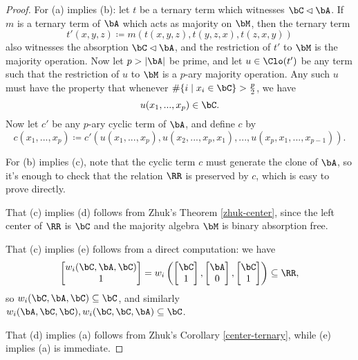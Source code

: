 \begin{proof} For (a) implies (b): let $t$ be a ternary term which witnesses $\bC \lhd \bA$. If $m$ is a ternary term of $\bA$ which acts as majority on $\bM$, then the ternary term
\[
t'(x,y,z) \coloneqq m(t(x,y,z), t(y,z,x), t(z,x,y))
\]
also witnesses the absorption $\bC \lhd \bA$, and the restriction of $t'$ to $\bM$ is the majority operation. Now let $p > |\bA|$ be prime, and let $u \in \Clo(t')$ be any term such that the restriction of $u$ to $\bM$ is a $p$-ary majority operation. Any such $u$ must have the property that whenever $\#\{i \mid x_i \in \bC\} > \frac{p}{2}$, we have
\[
u(x_1, ..., x_p) \in \bC.
\]
Now let $c'$ be any $p$-ary cyclic term of $\bA$, and define $c$ by
\[
c(x_1, ..., x_p) \coloneqq c'(u(x_1, ..., x_p), u(x_2, ..., x_p, x_1), ..., u(x_p, x_1, ..., x_{p-1})).
\]

For (b) implies (c), note that the cyclic term $c$ must generate the clone of $\bA$, so it's enough to check that the relation $\RR$ is preserved by $c$, which is easy to prove directly.

That (c) implies (d) follows from Zhuk's Theorem \ref{zhuk-center}, since the left center of $\RR$ is $\bC$ and the majority algebra $\bM$ is binary absorption free.

That (c) implies (e) follows from a direct computation: we have
\[
\begin{bmatrix}w_i(\bC,\bA,\bC)\\ 1\end{bmatrix} = w_i\left(\begin{bmatrix}\bC\\ 1\end{bmatrix}, \begin{bmatrix}\bA\\ 0\end{bmatrix}, \begin{bmatrix}\bC\\ 1\end{bmatrix}\right) \subseteq \RR,
\]
so $w_i(\bC,\bA,\bC) \subseteq \bC$, and similarly $w_i(\bA,\bC,\bC), w_i(\bC,\bC,\bA) \subseteq \bC$.

That (d) implies (a) follows from Zhuk's Corollary \ref{center-ternary}, while (e) implies (a) is immediate.
\end{proof}

